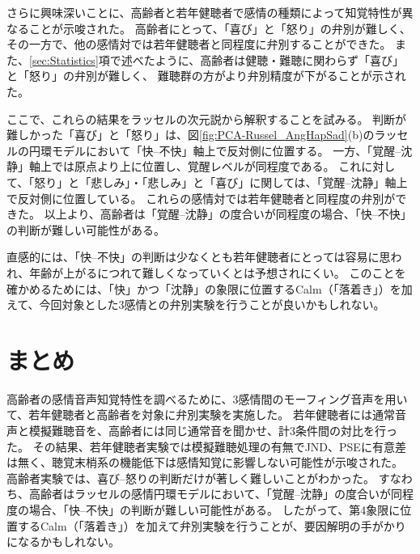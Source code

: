 さらに興味深いことに、高齢者と若年健聴者で感情の種類によって知覚特性が異なることが示唆された。
高齢者にとって、「喜び」と「怒り」の弁別が難しく、その一方で、他の感情対では若年健聴者と同程度に弁別することができた。
また、\ref{sec:Statistics}項で述べたように、高齢者は健聴・難聴に関わらず「喜び」と「怒り」の弁別が難しく、
難聴群の方がより弁別精度が下がることが示された。

ここで、これらの結果をラッセルの次元説\cite{russell1980circumplex}から解釈することを試みる。
判断が難しかった「喜び」と「怒り」は、図\ref{fig:PCA-Russel_AngHapSad}(b)のラッセルの円環モデルにおいて「快--不快」軸上で反対側に位置する。
一方、「覚醒--沈静」軸上では原点より上に位置し、覚醒レベルが同程度である。
これに対して、「怒り」と「悲しみ」・「悲しみ」と「喜び」に関しては、「覚醒--沈静」軸上で反対側に位置している。
これらの感情対では若年健聴者と同程度の弁別ができた。
以上より、高齢者は「覚醒--沈静」の度合いが同程度の場合、「快--不快」の判断が難しい可能性がある。

直感的には、「快--不快」の判断は少なくとも若年健聴者にとっては容易に思われ、年齢が上がるにつれて難しくなっていくとは予想されにくい。
このことを確かめるためには、「快」かつ「沈静」の象限に位置するCalm（「落着き」）を加えて、今回対象とした3感情との弁別実験を行うことが良いかもしれない。




\section{まとめ}
高齢者の感情音声知覚特性を調べるために、3感情間のモーフィング音声を用いて、若年健聴者と高齢者を対象に弁別実験を実施した。
若年健聴者には通常音声と模擬難聴音を、高齢者には同じ通常音を聞かせ、計3条件間の対比を行った。
その結果、若年健聴者実験では模擬難聴処理の有無でJND、PSEに有意差は無く、聴覚末梢系の機能低下は感情知覚に影響しない可能性が示唆された。
高齢者実験では、喜び--怒りの判断だけが著しく難しいことがわかった。
すなわち、高齢者はラッセルの感情円環モデル\cite{russell1980circumplex}において、「覚醒--沈静」の度合いが同程度の場合、「快--不快」の判断が難しい可能性がある。
したがって、第4象限に位置するCalm（「落着き」）を加えて弁別実験を行うことが、要因解明の手がかりになるかもしれない。

